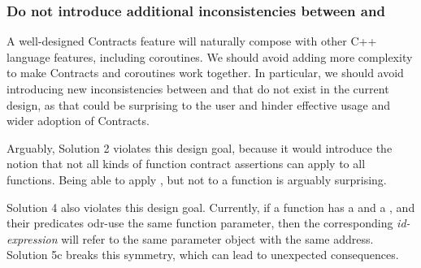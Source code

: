 %


\subsubsection{Do not introduce additional inconsistencies between  and }

A well-designed Contracts feature will naturally compose with other C++ language features, including coroutines. We should avoid adding more complexity to make Contracts and coroutines work together. In particular, we should avoid introducing new inconsistencies between  and  that do not exist in the current design, as that could be surprising to the user and hinder effective usage and wider adoption of Contracts.

Arguably, Solution 2 violates this design goal, because it would introduce the notion that not all kinds of function contract assertions can apply to all functions. Being able to apply , but not  to a function is arguably surprising.

Solution 4 also violates this design goal. Currently, if a function has a  and a , and their predicates odr-use the same function parameter, then the corresponding \emph{id-expression} will refer to the same parameter object with the same address. Solution 5c breaks this symmetry, which can lead to unexpected consequences.

